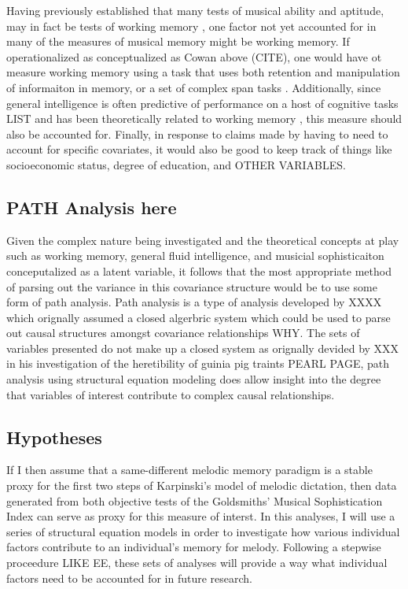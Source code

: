 \documentclass[]{book}
\begin{document}
Having previously established that many tests of musical ability and aptitude, may in fact be tests of working memory \citep{berzWorkingMemoryMusic1995}, one factor not yet accounted for in many of the measures of musical memory might be working memory.
If operationalized as conceptualized as Cowan above (CITE), one would have ot measure working memory using a task that uses both retention and manipulation of informaiton in memory, or a set of complex span tasks \citep{unsworthAutomatedVersionOperation2005}.
Additionally, since general intelligence is often predictive of performance on a host of cognitive tasks LIST and has been theoretically related to working memory \citep{kovacsProcessOverlapTheory2016}, this measure should also be accounted for.
Finally, in response to claims made by \citep{okadaIndividualDifferencesMusical2018a} having to need to account for specific covariates, it would also be good to keep track of things like socioeconomic status, degree of education, and OTHER VARIABLES.

\hypertarget{path-analysis-here}{%
\subsection{PATH Analysis here}\label{path-analysis-here}}

Given the complex nature being investigated and the theoretical concepts at play such as working memory, general fluid intelligence, and musicial sophisticaiton conceputalized as a latent variable, it follows that the most appropriate method of parsing out the variance in this covariance structure would be to use some form of path analysis.
Path analysis is a type of analysis developed by XXXX which orignally assumed a closed algerbric system which could be used to parse out causal structures amongst covariance relationships WHY.
The sets of variables presented do not make up a closed system as orignally devided by XXX in his investigation of the heretibility of guinia pig traints PEARL PAGE, path analysis using structural equation modeling does allow insight into the degree that variables of interest contribute to complex causal relationships.

\hypertarget{hypotheses}{%
\subsection{Hypotheses}\label{hypotheses}}

If I then assume that a same-different melodic memory paradigm is a stable proxy for the first two steps of Karpinski's model of melodic dictation, then data generated from both objective tests of the Goldsmiths' Musical Sophistication Index can serve as proxy for this measure of interst.
In this analyses, I will use a series of structural equation models in order to investigate how various individual factors contribute to an individual's memory for melody.
Following a stepwise proceedure LIKE EE, these sets of analyses will provide a way what individual factors need to be accounted for in future research.
\end{document}
